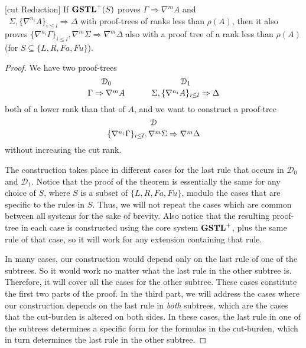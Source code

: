 \begin{thm}\label{thm:gstl-cut-reduction}[cut Reduction]
  If $\mathbf{GSTL}^+(S)$ proves $\Gamma \Rightarrow \nabla^m A$ and\\\ $\Sigma , \{\nabla^{n_i} A\}_{i \leq l} \Rightarrow \Delta$ with proof-trees of ranks less than $\rho(A)$, then it also proves $\{\nabla^{n_i} \Gamma\}_{i \leq l} , \nabla^m\Sigma \Rightarrow \nabla^m\Delta$ also with a proof tree of a rank less than $\rho(A)$ (for $S \subseteq \{L, R, Fa, Fu\}$).
  \end{thm}
  \begin{proof}
    We have two proof-trees
    \[
      \genfrac{}{}{0pt}{}{\mathcal{D}_0}{\Gamma \Rightarrow \nabla^m A}
      \hspace{3em}
      \genfrac{}{}{0pt}{}{\mathcal{D}_1}{\Sigma , \{\nabla^{n_i} A\}_{i \leq l} \Rightarrow \Delta}
    \]
    both of a lower rank than that of $A$, and we want to construct a proof-tree
    \[\genfrac{}{}{0pt}{}{\mathcal{D}}{\{\nabla^{n_i} \Gamma\}_{i \leq l} , \nabla^m \Sigma \Rightarrow \nabla^m \Delta} \]
    without increasing the cut rank.
  
    The construction takes place in different cases for the last rule that occurs in $\mathcal{D}_0$ and $\mathcal{D}_1$. Notice that the proof of the theorem is essentially the same for any choice of $S$, where $S$ is a subset of $\{L, R, Fa, Fu\}$, modulo the cases that are specific to the rules in $S$. Thus, we will not repeat the cases which are common between all systems for the sake of brevity. Also notice that the resulting proof-tree in each case is constructed using the core system $\mathbf{GSTL}^+$, plus the same rule of that case, so it will work for any extension containing that rule.
  
    In many cases, our construction would depend only on the last rule of one of the subtrees. So it would work no matter what the last rule in the other subtree is. Therefore, it will cover all the cases for the other subtree. These cases constitute the first two parts of the proof. In the third part, we will address the cases where our construction depends on the last rule in \emph{both} subtrees, which are the cases that the cut-burden is altered on both sides. In these cases, the last rule in one of the subtrees determines a specific form for the formulas in the cut-burden, which in turn determines the last rule in the other subtree.
  

\end{proof}
